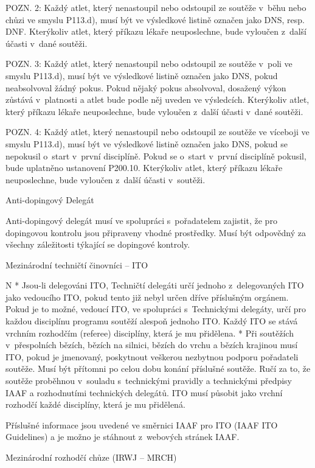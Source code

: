 POZN. 2: Každý atlet, který nenastoupil nebo odstoupil ze soutěže v~běhu nebo chůzi ve smyslu P113.d), musí být ve výsledkové listině označen jako DNS, resp. DNF. Kterýkoliv atlet, který příkazu lékaře neuposlechne, bude vyloučen z~další účasti v~dané soutěži.

POZN. 3: Každý atlet, který nenastoupil nebo odstoupil ze soutěže v~poli ve smyslu P113.d), musí být ve výsledkové listině označen jako DNS, pokud neabsolvoval žádný pokus. Pokud nějaký pokus absolvoval, dosažený výkon zůstává v~platnosti a atlet bude podle něj uveden ve výsledcích. Kterýkoliv atlet, který příkazu lékaře neuposlechne, bude vyloučen z~další účasti v~dané soutěži.

POZN. 4: Každý atlet, který nenastoupil nebo odstoupil ze soutěže ve víceboji ve smyslu P113.d), musí být ve výsledkové listině označen jako DNS, pokud se nepokusil o~start v~první disciplíně. Pokud se o~start v~první disciplíně pokusil, bude uplatněno ustanovení P200.10. Kterýkoliv atlet, který příkazu lékaře neuposlechne, bude vyloučen z~další účasti v~soutěži.


\secc Anti-dopingový Delegát

Anti-dopingový delegát musí ve spolupráci s~pořadatelem zajistit, že pro dopingovou kontrolu jsou připraveny vhodné prostředky.
Musí být odpovědný za všechny záležitosti týkající se dopingové kontroly.

\secc Mezinárodní techničtí činovníci -- ITO

\begitems \style N
* Jsou-li delegováni ITO, Techničtí delegáti určí jednoho z~delegovaných ITO jako vedoucího ITO, pokud tento již nebyl určen dříve příslušným orgánem. Pokud je to možné, vedoucí ITO, ve spolupráci s~Technickými delegáty, určí pro každou disciplínu programu soutěží alespoň jednoho ITO. Každý ITO se stává vrchním rozhodčím (referee) disciplíny, která je mu přidělena.
* Při soutěžích v~přespolních bězích, bězích na silnici, bězích do vrchu a bězích krajinou musí ITO, pokud je jmenovaný, poskytnout veškerou nezbytnou podporu pořadateli soutěže. Musí být přítomni po celou dobu konání příslušné soutěže. Ručí za to, že soutěže proběhnou v~souladu s~technickými pravidly a technickými předpisy IAAF a rozhodnutími technických delegátů. ITO musí působit jako vrchní rozhodčí každé disciplíny, která je mu přidělená.
\enditems

Příslušné informace jsou uvedené ve směrnici IAAF pro ITO (IAAF ITO Guidelines) a je možno je stáhnout z~webových stránek IAAF.

\secc Mezinárodní rozhodčí chůze (IRWJ -- MRCH)

